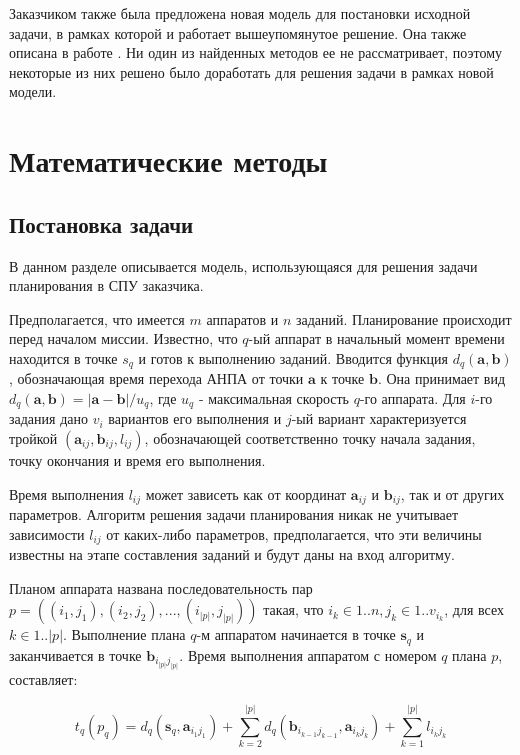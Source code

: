 \documentclass[a4paper,14pt,russian]{article}
\begin{document}
Заказчиком также была предложена новая модель для постановки исходной задачи, в рамках которой и работает вышеупомянутое решение. Она также описана в работе \cite{tuphanov1}. Ни один из найденных методов ее не рассматривает, поэтому некоторые из них решено было доработать для решения задачи в рамках новой модели.

\section{Математические методы}

\subsection{Постановка задачи}
В данном разделе описывается модель, использующаяся для решения задачи планирования в СПУ заказчика.

Предполагается, что имеется $m$ аппаратов и $n$ заданий. Планирование происходит перед началом миссии. Известно, что $q$-ый аппарат в начальный момент времени находится в точке $s_q$ и готов к выполнению заданий. Вводится функция $d_q(\mathbf{a}, \mathbf{b})$, обозначающая время перехода АНПА от точки $\mathbf{a}$ к точке $\mathbf{b}$. Она принимает вид $d_q(\mathbf{a}, \mathbf{b}) = |\mathbf{a} - \mathbf{b}| / u_q$, где $u_q$ - максимальная скорость $q$-го аппарата. Для $i$-го задания дано $v_i$ вариантов его выполнения и $j$-ый вариант характеризуется тройкой $(\mathbf{a}_{i  j}, \mathbf{b}_{i j}, l_{i j})$, обозначающей соответственно точку начала задания, точку окончания и время его выполнения.

Время выполнения $l_{i j}$ может зависеть как от координат $\mathbf{a}_{i j}$ и $\mathbf{b}_{i j}$, так и от других параметров. Алгоритм решения задачи планирования никак не учитывает зависимости $l_{i j}$ от каких-либо параметров, предполагается, что эти величины известны на этапе составления заданий и будут даны на вход алгоритму.

Планом аппарата названа последовательность пар \\ $p = ((i_1, j_1), (i_2, j_2), ..., (i_{|p|}, j_{|p|}))$ такая, что $i_k \in 1..n, j_k \in 1..v_{i_k}$, для всех $k \in 1..|p|$. Выполнение плана $q$-м аппаратом начинается в точке $\mathbf{s}_q$ и заканчивается в точке $\mathbf{b}_{i_{|p|} j_{|p|}}$. Время выполнения аппаратом с номером $q$ плана $p$, составляет:

\begin{equation} \label{varm1}
t_q(p_q) = d_q(\mathbf{s}_q, \mathbf{a}_{i_1 j_1}) + \sum_{k=2}^{|p|} d_q(\mathbf{b}_{i_{k-1} j_{k - 1}}, \mathbf{a}_{i_k j_k}) + \sum_{k=1}^{|p|}l_{i_k j_k}
\end{equation}
\end{document}
